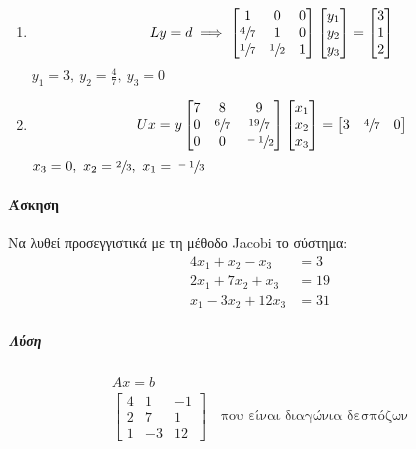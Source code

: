 \documentclass[11pt,a4paper,notitlepage,fleqn,final]{article}
\begin{document}
\begin{enumerate}
	\item
	\[
	Ly = d \implies
	\left[\begin{matrix}
	1&0&0\\\sfrac{4}{7} &1&0\\\sfrac{1}{7} &\sfrac{1}{2} & 1
	\end{matrix}\right]\left[\begin{matrix}
	y_1\\y_2\\y_3
	\end{matrix}\right] = \left[\begin{matrix}
	3\\1\\2
	\end{matrix}\right]
	\]
	\( y_1 = 3,\ y_2 = \frac{4}{7},\ y_3=0 \)

	\item \[
	Ux = y \left[\begin{matrix}
	7&8&9\\0& \sfrac{6}{7}  & \sfrac{19}{7}  \\
	0 & 0 & \sfrac{-1}{2}
	\end{matrix}\right]\left[\begin{matrix}
	x_1\\x_2\\x_3
	\end{matrix}\right] = \left[\begin{matrix}
	3&\sfrac{4}{7}  & 0
	\end{matrix}\right]
	\]
	\( x_3=0,\ x_2=\sfrac{2}{3},\ x_1 = \sfrac{-1}{3}   \)
\end{enumerate}

\paragraph{Άσκηση}
Να λυθεί προσεγγιστικά με τη μέθοδο Jacobi το σύστημα:
\begin{align*}
	4x_1+x_2-x_3 &= 3 \\
	2x_1+7x_2+x_3 &= 19 \\
	x_1-3x_2+12x_3 &= 31
\end{align*}
\subparagraph{Λύση}
\begin{gather*}
	Ax = b \\
	\left[\begin{matrix}
	4&1&-1 \\
	2&7&1 \\
	1&-3&12
	\end{matrix}\right] \quad \text{που είναι διαγώνια δεσπόζων}
\end{gather*}
\end{document}
